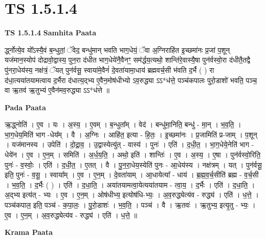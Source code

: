 \documentclass[17pt]{extarticle}
\begin{document}
\section{ TS 1.5.1.4 }

\textbf{TS 1.5.1.4 } \newline
\textbf{Samhita Paata} \newline

र्द्ध्नोत्ये॒व यो᳚ऽस्यै॒वं ब॒न्धुतां॒ ॅवेद॒ बन्धु॑मान् भवति भाग॒धेयं॒ ॅवा अ॒ग्निराहि॑त इ॒च्छमा॑नः प्र॒जां प॒शून् यज॑मान॒स्योप॑ दोद्रावो॒द्वास्य॒ पुन॒रा द॑धीत भाग॒धेये॑नै॒वैनꣳ॒॒ सम॑र्द्धय॒त्यथो॒ शान्ति॑रे॒वास्यै॒षा पुन॑र्वस्वो॒रा द॑धीतै॒तद्वै पु॑नरा॒धेय॑स्य॒ नक्ष॑त्रं॒ ॅयत् पुन॑र्वसू॒ स्वाया॑मे॒वैनं॑ दे॒वता॑यामा॒धाय॑ ब्रह्मवर्च॒सी भ॑वति द॒र्भै ( ) रा द॑धा॒त्यया॑तयामत्वाय द॒र्भैरा द॑धात्य॒द्भ्य ए॒वैन॒मोष॑धीभ्यो ऽव॒रुद्ध्या ऽऽ*ध॑त्ते॒ पञ्च॑कपालः पुरो॒डाशो॑ भवति॒ पञ्च॒ वा ऋ॒तव॑ ऋ॒तुभ्य॑ ए॒वैन॑मव॒रुद्ध्या ऽऽ*ध॑त्ते ॥ \newline

\textbf{Pada Paata} \newline

ऋ॒द्ध्नोति॑ । ए॒व । यः । अ॒स्य॒ । ए॒वम् । ब॒न्धुता᳚म् । वेद॑ । बन्धु॑मा॒निति॒ बन्धु॑ - मा॒न् । भ॒व॒ति॒ । भा॒ग॒धेय॒मिति॑ भाग -धेय᳚म् । वै । अ॒ग्निः । आहि॑त॒ इत्या - हि॒तः॒ । इ॒च्छमा॑नः । प्र॒जामिति॑ प्र-जाम् । प॒शून् । यज॑मानस्य । उपेति॑ । दो॒द्रा॒व॒ । उ॒द्वास्येत्यु॑त् - वास्य॑ । पुनः॑ । एति॑ । द॒धी॒त॒ । भा॒ग॒धेये॒नेति॑ भाग - धेये॑न । ए॒व । ए॒न॒म् । समिति॑ । अ॒र्ध॒य॒ति॒ । अथो॒ इति॑ । शान्तिः॑ । ए॒व । अ॒स्य॒ । ए॒षा । पुन॑र्वस्वो॒रिति॒ पुनः॑ - व॒स्वोः॒ । एति॑ । द॒धी॒त॒ । ए॒तत् । वै । पु॒न॒रा॒धेय॒स्येति॑ पुनः - आ॒धेय॑स्य । नक्ष॑त्रम् । यत् । पुन॑र्वसू॒ इति॒ पुनः॑ - व॒सू॒ । स्वाया᳚म् । ए॒व । ए॒न॒म् । दे॒वता॑याम् । आ॒धायेत्या᳚ - धाय॑ । ब्र॒ह्म॒व॒र्च॒सीति॑ ब्रह्म - व॒र्च॒सी । भ॒व॒ति॒ । द॒र्भैः ( ) । एति॑ । द॒धा॒ति॒ । अया॑तयामत्वा॒येत्यया॑तयाम - त्वा॒य॒ । द॒र्भैः । एति॑ । द॒धा॒ति॒ । अ॒द्भ्य इत्य॑त् - भ्यः । ए॒व । ए॒न॒म् । ओष॑धीभ्य॒ इत्योष॑धि-भ्यः॒ । अ॒व॒रुद्ध्येत्य॑व - रुद्ध्य॑ । एति॑ । ध॒त्ते॒ । पञ्च॑कपाल॒ इति॒ पञ्च॑ - क॒पा॒लः॒ । पु॒रो॒डाशः॑ । भ॒व॒ति॒ । पञ्च॑ । वै । ऋ॒तवः॑ । ऋ॒तुभ्य॒ इत्यृ॒तु - भ्यः॒ । ए॒व । ए॒न॒म् । अ॒व॒रुद्ध्येत्य॑व - रुद्ध्य॑ । एति॑ । ध॒त्ते॒ ॥  \newline


\textbf{Krama Paata} \newline
\end{document}
